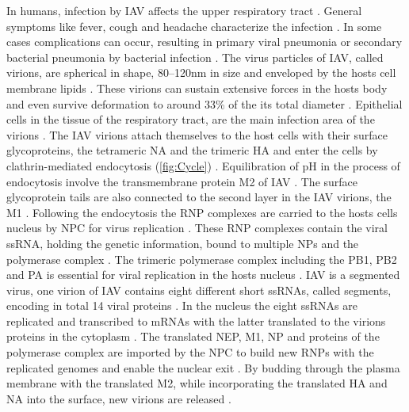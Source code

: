 In humans, infection by \gls{IAV} affects the upper respiratory tract \autocite{julkunen_inflammatory_2000}. General symptoms like fever, cough and headache characterize the infection \autocite{julkunen_inflammatory_2000}. In some cases complications can occur, resulting in primary viral pneumonia or secondary bacterial pneumonia by bacterial infection \autocite{julkunen_inflammatory_2000}. The virus particles of \gls{IAV}, called virions, are spherical in shape, 80–120nm in size and enveloped by the hosts cell membrane lipids \autocite{oxford_chapter_1987, mudhakir_learning_2009, cann_chapter_2016}. These virions can sustain extensive forces in the hosts body and even survive deformation to around 33\% of the its total diameter \autocite{schaap_effect_2012}. Epithelial cells in the tissue of the respiratory tract, are the main infection area of the virions \autocite{oxford_chapter_1987}. The \gls{IAV} virions attach themselves to the host cells with their surface glycoproteins, the tetrameric \gls{NA} and the trimeric \gls{HA} and enter the cells by clathrin-mediated endocytosis (\autoref{fig:Cycle}) \autocite{wilson_structure_1981, varghese_structure_1983, jones_global_2008, mudhakir_learning_2009}. Equilibration of pH in the process of endocytosis involve the transmembrane protein \gls{M2} of \gls{IAV} \autocite{pielak_influenza_2011}. The surface glycoprotein tails are also connected to the second layer in the \gls{IAV} virions, the \gls{M1} \autocite{ali_influenza_2000}. Following the endocytosis the \gls{RNP} complexes are carried to the hosts cells nucleus by \gls{NPC} for virus replication \autocite{eisfeld_at_2015}. These \gls{RNP} complexes contain the viral \gls{ssRNA}, holding the genetic information, bound to multiple \glspl{NP} and the polymerase complex \autocite{eisfeld_at_2015}. The trimeric polymerase complex including the \gls{PB1}, \gls{PB2} and \gls{PA} is essential for viral replication in the hosts nucleus \autocite{area_3d_2004, eisfeld_at_2015}. \gls{IAV} is a segmented virus, one virion of \gls{IAV} contains eight different short \glspl{ssRNA}, called segments, encoding in total 14 viral proteins \autocite{eisfeld_at_2015}. In the nucleus the eight \glspl{ssRNA} are replicated and transcribed to \glspl{mRNA} with the latter translated to the virions proteins in the cytoplasm \autocite{eisfeld_at_2015}. The translated \gls{NEP}, \gls{M1}, \gls{NP} and proteins of the polymerase complex are imported by the \gls{NPC} to build new \glspl{RNP} with the replicated genomes and enable the nuclear exit \autocite{eisfeld_at_2015}. By budding through the plasma membrane with the translated \gls{M2}, while incorporating the translated \gls{HA} and \gls{NA} into the surface, new virions are released \autocite{eisfeld_at_2015}.

